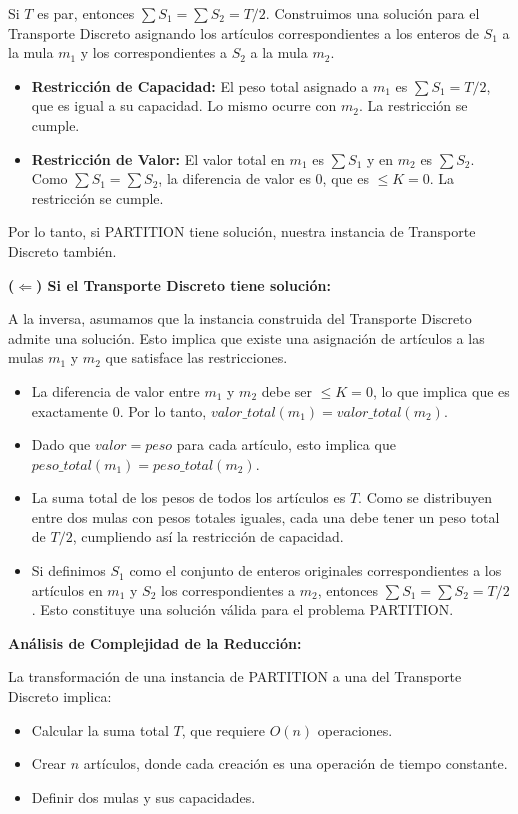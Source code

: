 \documentclass[12pt, a4paper]{article}
\begin{document}
    Si $T$ es par, entonces $\sum S_1 = \sum S_2 = T/2$. Construimos una solución para el Transporte Discreto asignando los artículos correspondientes a los enteros de $S_1$ a la mula $m_1$ y los correspondientes a $S_2$ a la mula $m_2$.

    \begin{itemize}
        \item \textbf{Restricción de Capacidad:} El peso total asignado a $m_1$ es $\sum S_1 = T/2$, que es igual a su capacidad. Lo mismo ocurre con $m_2$. La restricción se cumple.
        \item \textbf{Restricción de Valor:} El valor total en $m_1$ es $\sum S_1$ y en $m_2$ es $\sum S_2$. Como $\sum S_1 = \sum S_2$, la diferencia de valor es 0, que es $\leq K=0$. La restricción se cumple.
    \end{itemize}

    Por lo tanto, si PARTITION tiene solución, nuestra instancia de Transporte Discreto también.

    \textbf{($\Leftarrow$) Si el Transporte Discreto tiene solución:}

    A la inversa, asumamos que la instancia construida del Transporte Discreto admite una solución. Esto implica que existe una asignación de artículos a las mulas $m_1$ y $m_2$ que satisface las restricciones.

    \begin{itemize}
        \item La diferencia de valor entre $m_1$ y $m_2$ debe ser $\leq K=0$, lo que implica que es exactamente 0. Por lo tanto, $valor\_total(m_1) = valor\_total(m_2)$.
        \item Dado que $valor = peso$ para cada artículo, esto implica que $peso\_total(m_1) = peso\_total(m_2)$.
        \item La suma total de los pesos de todos los artículos es $T$. Como se distribuyen entre dos mulas con pesos totales iguales, cada una debe tener un peso total de $T/2$, cumpliendo así la restricción de capacidad.
        \item Si definimos $S_1$ como el conjunto de enteros originales correspondientes a los artículos en $m_1$ y $S_2$ los correspondientes a $m_2$, entonces $\sum S_1 = \sum S_2 = T/2$. Esto constituye una solución válida para el problema PARTITION.
    \end{itemize}

    \textbf{Análisis de Complejidad de la Reducción:}

    La transformación de una instancia de PARTITION a una del Transporte Discreto implica:
    \begin{itemize}
        \item Calcular la suma total $T$, que requiere $O(n)$ operaciones.
        \item Crear $n$ artículos, donde cada creación es una operación de tiempo constante.
        \item Definir dos mulas y sus capacidades.
    \end{itemize}
\end{document}
